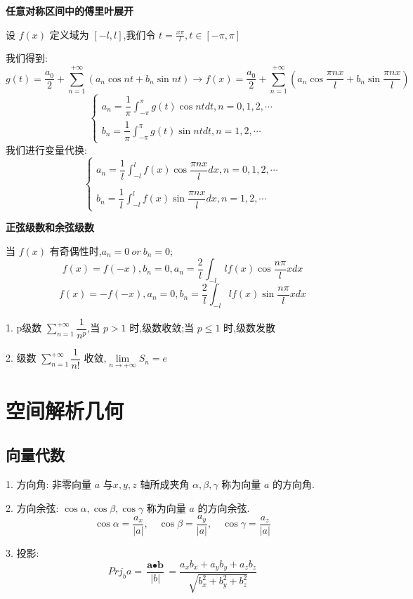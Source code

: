\textbf{任意对称区间中的傅里叶展开}
\begin{definition}
	设 $f(x)$ 定义域为 $[-l,l]$,我们令 $t=\frac{x\pi}{l},t\in[-\pi,\pi]$

	我们得到:
	$$g(t)=\frac{a_{0}}{2}+\sum\limits_{n=1}^{+\infty}(a_{n}\cos nt+b_{n}\sin nt)\rightarrow f(x)=\frac{a_{0}}{2}+\sum\limits_{n=1}^{+\infty}(a_{n}\cos \dfrac{\pi nx}{l}+b_{n}\sin \dfrac{\pi nx}{l})$$
	$$\left\lbrace \begin{array}{l}
			a_{n}=\dfrac{1}{\pi}\int_{-\pi}^{\pi}g(t)\cos ntdt,n=0,1,2,\cdots \\
			b_{n}=\dfrac{1}{\pi}\int_{-\pi}^{\pi}g(t)\sin ntdt,n=1,2,\cdots
		\end{array}\right. $$
	我们进行变量代换:
	$$\left\lbrace \begin{array}{l}
			a_{n}=\dfrac{1}{l}\int_{-l}^{l}f(x)\cos \dfrac{\pi nx}{l}dx,n=0,1,2,\cdots \\
			\\
			b_{n}=\dfrac{1}{l}\int_{-l}^{l}f(x)\sin \dfrac{\pi nx}{l}dx,n=1,2,\cdots
		\end{array}\right. $$
\end{definition}
\textbf{正弦级数和余弦级数}

当 $f(x)$ 有奇偶性时,$a_{n}=0 \ or\ b_{n}=0$;
$$f(x)=f(-x),b_{n}=0,a_{n}=\dfrac{2}{l}\int_{-l}{l}f(x)\cos \dfrac{n\pi}{l}xdx$$
$$f(x)=-f(-x),a_{n}=0,b_{n}=\dfrac{2}{l}\int_{-l}{l}f(x)\sin \dfrac{n\pi}{l}xdx$$
\begin{anymark}[总结]\label{mark: $p$级数}
	1. p级数 $\sum\limits_{n=1}^{+\infty}\dfrac{1}{n^{p}}$,当 $p>1$ 时,级数收敛;当 $p\leq 1$ 时,级数发散

	2. 级数 $\sum\limits_{n=1}^{+\infty}\dfrac{1}{n!}$ 收敛,$\lim\limits_{n\rightarrow+\infty}S_{n}=e$
\end{anymark}






\chapter{空间解析几何}
\section{向量代数}
\begin{definition}
	1. 方向角: 非零向量 $a$ 与$x,y,z$ 轴所成夹角 $\alpha,\beta,\gamma$ 称为向量 $a$ 的方向角. 
	
	2. 方向余弦: $\cos \alpha,\cos \beta,\cos\gamma$ 称为向量 $a$ 的方向余弦.
	$$\cos \alpha=\frac{a_{x}}{|a|},\quad \cos \beta=\frac{a_{y}}{|a|},\quad \cos \gamma=\frac{a_{z}}{|a|}$$
	
	3. 投影: 
	$$Prj_{b}a=\frac{\textbf{a}\bullet\textbf{b}}{|b|}=\frac{a_{x}b_{x}+a_{y}b_{y}+a_{z}b_{z}}{\sqrt{b_{x}^2+b_{y}^2+b_{z}^2}}$$
\end{definition}
